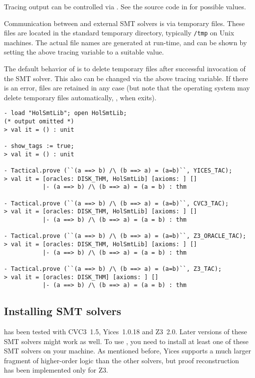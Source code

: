 Tracing output can be controlled via .  See the source code in  for
possible values.

Communication between \HOL{} and external SMT solvers is via temporary
files.  These files are located in the standard temporary directory,
typically {\tt /tmp} on Unix machines.  The actual file names are
generated at run-time, and can be shown by setting the above tracing
variable to a suitable value.

The default behavior of  is to delete temporary files
after successful invocation of the SMT solver.  This also can be
changed via the above tracing variable.  If there is an error, files
are retained in any case (but note that the operating system may
delete temporary files automatically, \eg, when \HOL{} exits).

\begin{session}
\begin{verbatim}
- load "HolSmtLib"; open HolSmtLib;
(* output omitted *)
> val it = () : unit

- show_tags := true;
> val it = () : unit

- Tactical.prove (``(a ==> b) /\ (b ==> a) = (a=b)``, YICES_TAC);
> val it = [oracles: DISK_THM, HolSmtLib] [axioms: ] []
           |- (a ==> b) /\ (b ==> a) = (a = b) : thm

- Tactical.prove (``(a ==> b) /\ (b ==> a) = (a=b)``, CVC3_TAC);
> val it = [oracles: DISK_THM, HolSmtLib] [axioms: ] []
           |- (a ==> b) /\ (b ==> a) = (a = b) : thm

- Tactical.prove (``(a ==> b) /\ (b ==> a) = (a=b)``, Z3_ORACLE_TAC);
> val it = [oracles: DISK_THM, HolSmtLib] [axioms: ] []
           |- (a ==> b) /\ (b ==> a) = (a = b) : thm

- Tactical.prove (``(a ==> b) /\ (b ==> a) = (a=b)``, Z3_TAC);
> val it = [oracles: DISK_THM] [axioms: ] []
           |- (a ==> b) /\ (b ==> a) = (a = b) : thm
\end{verbatim}
\end{session}

\subsection{Installing SMT solvers}

 has been tested with CVC3~1.5, Yices~1.0.18 and Z3~2.0.
Later versions of these SMT solvers might work as well.  To use
, you need to install at least one of these SMT solvers
on your machine.  As mentioned before, Yices supports a much larger
fragment of higher-order logic than the other solvers, but proof
reconstruction has been implemented only for Z3.


